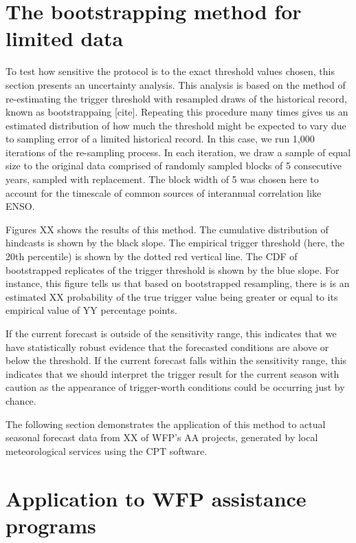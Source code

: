 \documentclass{ametsocV5}
\begin{document}
\section{The bootstrapping method for limited data}


To test how sensitive the protocol is to the exact threshold values chosen, this section presents an uncertainty analysis. This analysis is based on the method of re-estimating the trigger threshold with resampled draws of the historical record, known as bootstrappaing [cite]. Repeating this procedure many times gives us an estimated distribution of how much the threshold might be expected to vary due to sampling error of a limited historical record. In this case, we run 1,000 iterations of the re-sampling process. In each iteration, we draw a sample of equal size to the original data comprised of randomly sampled blocks of 5 consecutive years, sampled with replacement. The block width of 5 was chosen here to account for the timescale of common sources of interannual correlation like ENSO. 

Figures XX shows the results of this method. The cumulative distribution of hindcasts is shown by the black slope. The empirical trigger threshold (here, the 20th percentile) is shown by the dotted red vertical line. The CDF of bootstrapped replicates of the trigger threshold is shown by the blue slope. For instance, this figure tells us that based on bootstrapped resampling, there is is an estimated XX probability of the true trigger value being greater or equal to its empirical value of YY percentage points. 

If the current forecast is outside of the sensitivity range, this indicates that we have statistically robust evidence that the forecasted conditions are above or below the threshold. If the current forecast falls within the sensitivity range, this indicates that we should interpret the trigger result for the current season with caution as the appearance of trigger-worth conditions could be occurring just by chance.

The following section demonstrates the application of this method to actual seasonal forecast data from XX of WFP's AA projects, generated by local meteorological services using the CPT software. 

\section{Application to WFP assistance programs}
\end{document}
